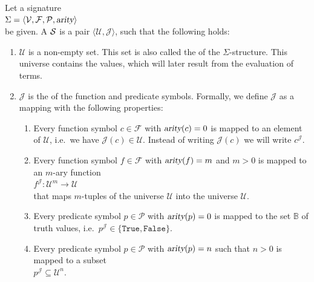 \begin{Definition}[Structure]
    Let a signature \\[0.2cm]
    \hspace*{1.3cm} $\Sigma = \langle \mathcal{V}, \mathcal{F}, \mathcal{P}, \textsl{arity} \rangle$ \\[0.2cm]
    be given. A  $\mathcal{S}$ is a
    pair $\langle \mathcal{U}, \mathcal{J} \rangle$, such that the following holds:
    \begin{enumerate}
        \item $\mathcal{U}$ is a non-empty set. This set is also called the
                of the $\Sigma$-structure. This universe contains the values,
              which will later result from the evaluation of terms.
        \item $\mathcal{J}$ is the   of the function and predicate symbols.
              Formally, we define $\mathcal{J}$ as a mapping with the following properties:
        \begin{enumerate}
        \item Every function symbol $c \in \mathcal{F}$ with $\textsl{arity}(c) = 0$ is mapped to an element
              of $\mathcal{U}$, i.e.~we have $\mathcal{J}(c) \in \mathcal{U}$.  Instead of writing
              $\mathcal{J}(c)$ we will write $c^{\mathcal{J}}$.
        \item Every function symbol $f \in \mathcal{F}$ with $\textsl{arity}(f) = m$ and $m > 0$ is mapped to
              an $m$-ary function \\[0.2cm]
              \hspace*{1.3cm}
              $f^\mathcal{J}\colon \mathcal{U}^m \rightarrow \mathcal{U}$ \\[0.2cm]
              that maps $m$-tuples of the universe $\mathcal{U}$ into the universe $\mathcal{U}$.
        \item Every predicate symbol $p \in \mathcal{P}$ with $\textsl{arity}(p) = 0$ is mapped to
              the set $\mathbb{B}$ of truth values, i.e.~$p^{\mathcal{J}} \in \{ \mathtt{True}, \mathtt{False}\}$.
        \item Every predicate symbol $p \in \mathcal{P}$ with $\textsl{arity}(p) = n$ such that $n > 0$ is mapped to
              a subset \\[0.2cm]
              \hspace*{1.3cm} 
              $p^\mathcal{J} \subseteq \mathcal{U}^n$. \\[0.2cm]

\end{enumerate}
\end{enumerate}
\end{Definition}
